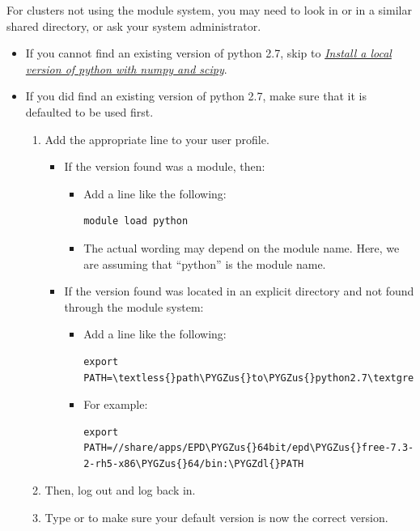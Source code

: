 \documentclass[letterpaper,10pt,english]{sphinxmanual}
\def\PYGZus{\char`\_}
\def\PYGZdl{\char`\$}
\begin{document}
For clusters not using the module system, you may need to look in  or in a similar shared directory, or ask your system administrator.
\begin{itemize}
\item {} 
If you cannot find an existing version of python 2.7, skip to {\hyperref[1_0_installation:install-local-python]{\emph{Install a local version of python with numpy and scipy}}}.

\item {} 
If you did find an existing version of python 2.7, make sure that it is defaulted to be used first.
\begin{enumerate}
\item {} 
Add the appropriate line to your user profile.
\begin{itemize}
\item {} 
If the version found was a module, then:
\begin{itemize}
\item {} 
Add a line like the following:

\begin{Verbatim}[commandchars=\\\{\}]
module load python
\end{Verbatim}

\item {} 
The actual wording may depend on the module name. Here, we are assuming that ``python'' is the module name.

\end{itemize}

\item {} 
If the version found was located in an explicit directory and not found through the module system:
\begin{itemize}
\item {} 
Add a line like the following:

\begin{Verbatim}[commandchars=\\\{\}]
export PATH=\textless{}path\PYGZus{}to\PYGZus{}python2.7\textgreater{}:\PYGZdl{}PATH
\end{Verbatim}

\item {} 
For example:

\begin{Verbatim}[commandchars=\\\{\}]
export PATH=//share/apps/EPD\PYGZus{}64bit/epd\PYGZus{}free-7.3-2-rh5-x86\PYGZus{}64/bin:\PYGZdl{}PATH
\end{Verbatim}

\end{itemize}

\end{itemize}

\item {} 
Then, log out and log back in.

\item {} 
Type  or  to make sure your default version is now the correct version.

\end{enumerate}

\end{itemize}
\end{document}
